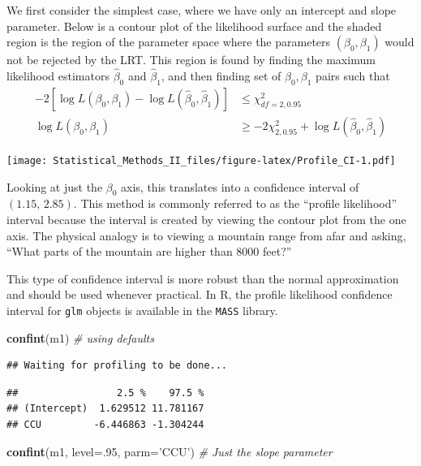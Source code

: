 \documentclass[]{book}
\newenvironment{Shaded}{\begin{snugshade}}{\end{snugshade}}
\newcommand{\KeywordTok}[1]{\textcolor[rgb]{0.13,0.29,0.53}{\textbf{{#1}}}}
\newcommand{\DataTypeTok}[1]{\textcolor[rgb]{0.13,0.29,0.53}{{#1}}}
\newcommand{\DecValTok}[1]{\textcolor[rgb]{0.00,0.00,0.81}{{#1}}}
\newcommand{\StringTok}[1]{\textcolor[rgb]{0.31,0.60,0.02}{{#1}}}
\newcommand{\CommentTok}[1]{\textcolor[rgb]{0.56,0.35,0.01}{\textit{{#1}}}}
\newcommand{\NormalTok}[1]{{#1}}
\theoremstyle{definition}
\theoremstyle{definition}
\theoremstyle{remark}
\begin{document}
We first consider the simplest case, where we have only an intercept and
slope parameter. Below is a contour plot of the likelihood surface and
the shaded region is the region of the parameter space where the
parameters \(\left(\beta_{0},\beta_{1}\right)\) would not be rejected by
the LRT. This region is found by finding the maximum likelihood
estimators \(\hat{\beta}_{0}\) and \(\hat{\beta}_{1}\), and then finding
set of \(\beta_{0},\beta_{1}\) pairs such that \[\begin{aligned}
-2\left[\log L\left(\beta_{0},\beta_{1}\right)-\log L\left(\hat{\beta}_{0},\hat{\beta}_{1}\right)\right]    & \le \chi_{df=2,0.95}^{2} \\
\log L\left(\beta_{0},\beta_{1}\right)  &\ge    -2\chi_{2,0.95}^{2}+\log L\left(\hat{\beta}_{0},\hat{\beta}_{1}\right)
\end{aligned}\]

\texttt{[image: Statistical\_Methods\_II\_files/figure-latex/Profile\_CI-1.pdf]}

Looking at just the \(\beta_{0}\) axis, this translates into a
confidence interval of \((1.15,\, 2.85)\). This method is commonly
referred to as the ``profile likelihood'' interval because the interval
is created by viewing the contour plot from the one axis. The physical
analogy is to viewing a mountain range from afar and asking, ``What
parts of the mountain are higher than 8000 feet?''

This type of confidence interval is more robust than the normal
approximation and should be used whenever practical. In R, the profile
likelihood confidence interval for \texttt{glm} objects is available in
the \texttt{MASS} library.

\begin{Shaded}
\begin{Highlighting}[]
\KeywordTok{confint}\NormalTok{(m1) }\CommentTok{# using defaults}
\end{Highlighting}
\end{Shaded}

\begin{verbatim}
## Waiting for profiling to be done...
\end{verbatim}

\begin{verbatim}
##                 2.5 %    97.5 %
## (Intercept)  1.629512 11.781167
## CCU         -6.446863 -1.304244
\end{verbatim}

\begin{Shaded}
\begin{Highlighting}[]
\KeywordTok{confint}\NormalTok{(m1, }\DataTypeTok{level=}\NormalTok{.}\DecValTok{95}\NormalTok{, }\DataTypeTok{parm=}\StringTok{'CCU'}\NormalTok{) }\CommentTok{# Just the slope parameter}
\end{Highlighting}
\end{Shaded}
\end{document}
